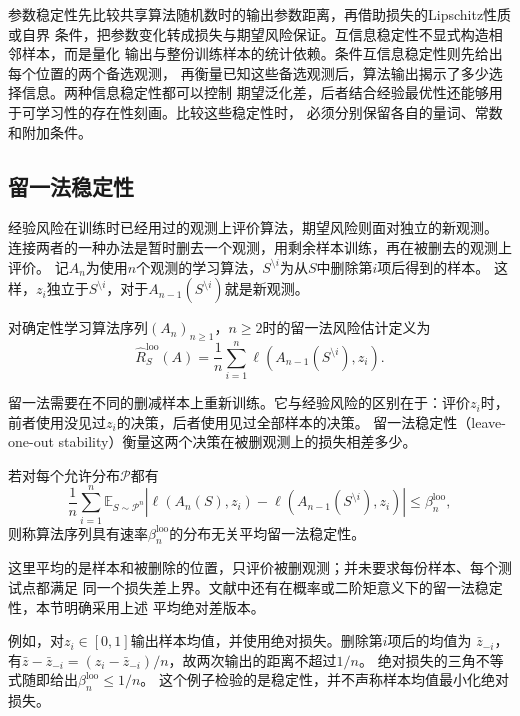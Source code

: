 参数稳定性先比较共享算法随机数时的输出参数距离，再借助损失的Lipschitz性质或自界
条件，把参数变化转成损失与期望风险保证。互信息稳定性不显式构造相邻样本，而是量化
输出与整份训练样本的统计依赖。条件互信息稳定性则先给出每个位置的两个备选观测，
再衡量已知这些备选观测后，算法输出揭示了多少选择信息。两种信息稳定性都可以控制
期望泛化差，后者结合经验最优性还能够用于可学习性的存在性刻画。比较这些稳定性时，
必须分别保留各自的量词、常数和附加条件。

\subsection{留一法稳定性}

经验风险在训练时已经用过的观测上评价算法，期望风险则面对独立的新观测。
连接两者的一种办法是暂时删去一个观测，用剩余样本训练，再在被删去的观测上评价。
记$A_n$为使用$n$个观测的学习算法，$S^{\setminus i}$为从$S$中删除第$i$项后得到的样本。
这样，$z_i$独立于$S^{\setminus i}$，对于$A_{n-1}(S^{\setminus i})$就是新观测。

\begin{definition}[留一法风险估计]
\label{def:loo-risk}
对确定性学习算法序列$(A_n)_{n\geq1}$，$n\geq2$时的留一法风险估计定义为
\[
 \hat R_S^{\mathrm{loo}}(A)
 =\frac1n\sum_{i=1}^n\ell(A_{n-1}(S^{\setminus i}),z_i).
\]
\end{definition}

留一法需要在不同的删减样本上重新训练。它与经验风险的区别在于：评价$z_i$时，
前者使用没见过$z_i$的决策，后者使用见过全部样本的决策。
留一法稳定性（leave-one-out stability）衡量这两个决策在被删观测上的损失相差多少。

\begin{definition}[平均留一法稳定性]
\label{def:loo-stability}
若对每个允许分布$\mathcal P$都有
\[
 \frac1n\sum_{i=1}^n\mathbb E_{S\sim\mathcal P^n}
 \left|\ell(A_n(S),z_i)-\ell(A_{n-1}(S^{\setminus i}),z_i)\right|
 \leq\beta_n^{\mathrm{loo}},
\]
则称算法序列具有速率$\beta_n^{\mathrm{loo}}$的分布无关平均留一法稳定性。
\end{definition}

这里平均的是样本和被删除的位置，只评价被删观测；并未要求每份样本、每个测试点都满足
同一个损失差上界。文献中还有在概率或二阶矩意义下的留一法稳定性，本节明确采用上述
平均绝对差版本。

例如，对$z_i\in[0,1]$输出样本均值，并使用绝对损失。删除第$i$项后的均值为
$\bar z_{-i}$，有$\bar z-\bar z_{-i}=(z_i-\bar z_{-i})/n$，故两次输出的距离不超过$1/n$。
绝对损失的三角不等式随即给出$\beta_n^{\mathrm{loo}}\leq1/n$。
这个例子检验的是稳定性，并不声称样本均值最小化绝对损失。

